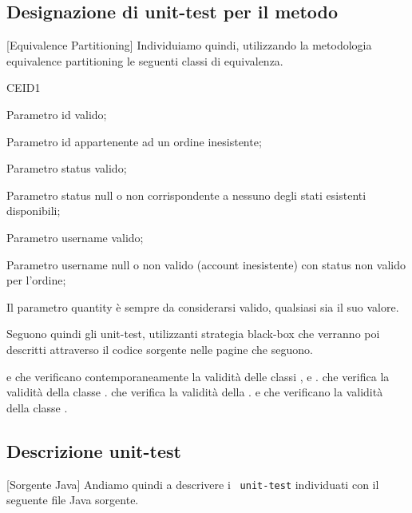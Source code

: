 \subsection{Designazione di unit-test per il metodo}[Equivalence Partitioning]
Individuiamo quindi, utilizzando la metodologia equivalence partitioning le seguenti classi di equivalenza.
\begin{eqpart}{CEID1}
	\item[CEID1] Parametro id valido;
	\item[CEID2] Parametro id appartenente ad un ordine inesistente;
	\item[CES1] Parametro status valido;
	\item[CES2] Parametro status null o non corrispondente a nessuno degli stati esistenti disponibili;
	\item[CEU1] Parametro username valido;
	\item[CEU2] Parametro username null o non valido (account inesistente) con status non valido per l'ordine;
\end{eqpart}

Il parametro quantity è sempre da considerarsi valido, qualsiasi sia il suo valore.
\par\vspace{3mm}

Seguono quindi gli unit-test, utilizzanti strategia black-box che 
verranno poi descritti attraverso il codice sorgente nelle pagine che seguono.

\begin{eqtest}
	 e  che
	verificano contemporaneamente la validità delle classi ,  e .
	 che verifica la validità della classe .
	 che verifica la validità della .
	 e 
	 che verificano la validità
	della classe .
\end{eqtest}

\newpage
\subsection{Descrizione unit-test}[Sorgente Java]
Andiamo quindi a descrivere i \texttt{\color{ddchaptercolor!80!black}\theenumi\ unit-test} individuati
con il seguente file Java sorgente.

